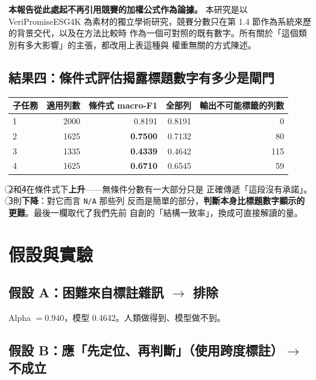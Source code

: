 \documentclass[11pt,a4paper]{ctexart}
\newcommand{\fn}[1]{\texttt{#1}}
\begin{document}
\begin{tcolorbox}[colback=gray!8, colframe=gray!55]
\textbf{本報告從此處起不再引用競賽的加權公式作為論據。} 本研究是以 VeriPromiseESG4K
為素材的獨立學術研究，競賽分數只在第 1.4 節作為系統來歷的背景交代，以及在方法比較時
作為一個可對照的既有數字。所有關於「這個類別有多大影響」的主張，都改用上表這種與
權重無關的方式陳述。
\end{tcolorbox}

\subsection{結果四：條件式評估揭露標題數字有多少是閘門}

\begin{table}[h]
\centering\small
\begin{tabular}{@{}lrrrr@{}}
\toprule
子任務 & 適用列數 & 條件式 macro-F1 & 全部列 & 輸出不可能標籤的列數 \\
\midrule
\textcircled{1} & 2000 & 0.8191 & 0.8191 & 0 \\
\textcircled{2} & 1625 & \textbf{0.7500} & 0.7132 & 80 \\
\textcircled{3} & 1335 & \textbf{0.4339} & 0.4642 & 115 \\
\textcircled{4} & 1625 & \textbf{0.6710} & 0.6545 & 59 \\
\bottomrule
\end{tabular}
\end{table}

\textcircled{2}和\textcircled{4}在條件式下\textbf{上升}——無條件分數有一大部分只是
正確傳遞「這段沒有承諾」。\textcircled{3}則\textbf{下降}：對它而言 \fn{N/A} 那些列
反而是簡單的部分，\textbf{判斷本身比標題數字顯示的更難}。最後一欄取代了我們先前
自創的「結構一致率」，換成可直接解讀的量。

\section{假設與實驗}

\subsection*{假設 A：困難來自標註雜訊 $\to$ 排除}
Alpha $=0.940$，模型 0.4642。人類做得到、模型做不到。

\subsection*{假設 B：應「先定位、再判斷」（使用跨度標註）$\to$ 不成立}
\end{document}

